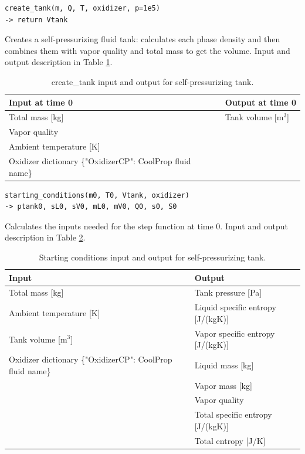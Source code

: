 \begin{verbatim}
create_tank(m, Q, T, oxidizer, p=1e5)
-> return Vtank
\end{verbatim}
\hspace*{2em} Creates a self-pressurizing fluid tank: calculates each phase density and then combines them with vapor quality and total mass to get the volume. Input and output description in Table \ref{Tab: CreateSelf-press}.
\begin{table}[h!]
\centering
\begin{tabular}{l|l}
\hline
\textbf{Input at time 0} & \textbf{Output at time 0} \\
\hline
Total mass [kg] & Tank volume [m$^3$] \\
Vapor quality &  \\
Ambient temperature [K] &  \\
Oxidizer dictionary \{"OxidizerCP": CoolProp fluid name\} &  \\
\hline
\end{tabular}
\caption{create\_tank input and output for self-pressurizing tank.}
\label{Tab: CreateSelf-press}
\end{table}

\begin{verbatim}
starting_conditions(m0, T0, Vtank, oxidizer)
-> ptank0, sL0, sV0, mL0, mV0, Q0, s0, S0
\end{verbatim}
\hspace*{2em} Calculates the inputs needed for the step function at time 0. Input and output description in Table \ref{Tab: StartSelf-press}.
\begin{table}[h!]
\centering
\begin{tabular}{l|l}
\hline
\textbf{Input} & \textbf{Output} \\
\hline
Total mass [kg] & Tank pressure [Pa] \\
Ambient temperature [K] & Liquid specific entropy [J/(kgK)] \\
Tank volume [m$^3$] & Vapor specific entropy [J/(kgK)] \\
Oxidizer dictionary \{"OxidizerCP": CoolProp fluid name\} & Liquid mass [kg] \\
 & Vapor mass [kg] \\
 & Vapor quality \\
 & Total specific entropy [J/(kgK)] \\
 & Total entropy [J/K] \\
\hline
\end{tabular}
\caption{Starting conditions input and output for self-pressurizing tank.}
\label{Tab: StartSelf-press}
\end{table}
